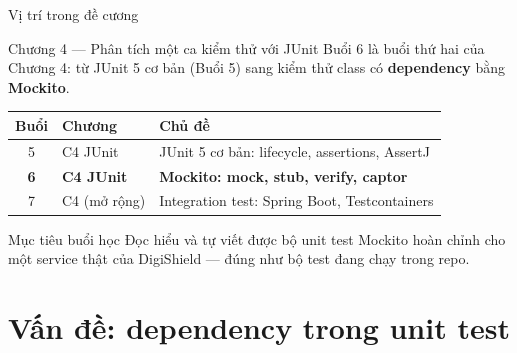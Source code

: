 \documentclass[aspectratio=169,12pt]{beamer}
\begin{document}
\begin{frame}{Vị trí trong đề cương}
  \begin{block}{Chương 4 --- Phân tích một ca kiểm thử với JUnit}
    Buổi 6 là buổi thứ hai của Chương 4: từ JUnit 5 cơ bản (Buổi 5)
    sang kiểm thử class có \textbf{dependency} bằng \textbf{Mockito}.
  \end{block}

  \begin{center}
  \small
  \begin{tabular}{cll}
    \toprule
    \textbf{Buổi} & \textbf{Chương} & \textbf{Chủ đề} \\
    \midrule
    5 & C4 JUnit & JUnit 5 cơ bản: lifecycle, assertions, AssertJ \\
    \textbf{6} & \textbf{C4 JUnit} & \textbf{Mockito: mock, stub, verify, captor} \\
    7 & C4 (mở rộng) & Integration test: Spring Boot, Testcontainers \\
    \bottomrule
  \end{tabular}
  \end{center}

  \begin{exampleblock}{Mục tiêu buổi học}
    Đọc hiểu và tự viết được bộ unit test Mockito hoàn chỉnh cho một
    service thật của DigiShield --- đúng như bộ test đang chạy trong repo.
  \end{exampleblock}
\end{frame}

\section{Vấn đề: dependency trong unit test}
\end{document}
